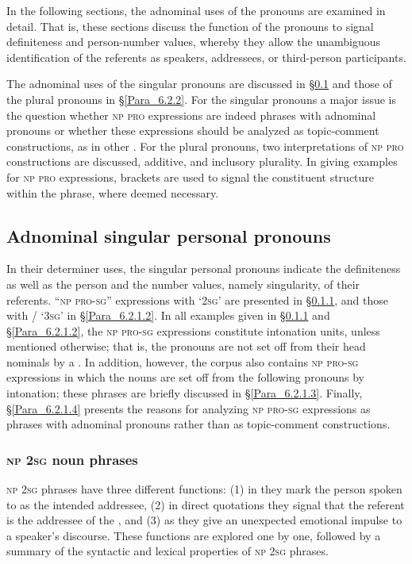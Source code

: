 In the following sections, the adnominal uses of the pronouns are examined in detail. That is, these sections discuss the function of the pronouns to signal definiteness and person-number values, whereby they allow the unambiguous identification of the referents as speakers, addressees, or third-person participants.



The adnominal uses of the singular pronouns are discussed in §\ref{Para_6.2.1} and those of the plural pronouns in §\ref{Para_6.2.2}. For the singular pronouns a major issue is the question whether \textsc{np} \textsc{pro} expressions are indeed  phrases with adnominal pronouns or whether these expressions should be analyzed as topic-comment constructions, as in other . For the plural pronouns, two interpretations of \textsc{np} \textsc{pro} constructions are discussed, additive, and  inclusory plurality. In giving examples for \textsc{np} \textsc{pro} expressions, brackets are used to signal the constituent structure within the  phrase, where deemed necessary.


\subsection{Adnominal singular personal pronouns}
\label{Para_6.2.1}
In their determiner uses, the singular personal pronouns indicate the definiteness as well as the person and the number values, namely singularity, of their referents. ``\textsc{np} \textsc{pro-sg}'' expressions with  ‘\textsc{2sg}’ are presented in §\ref{Para_6.2.1.1}, and those with / ‘\textsc{3sg}’ in §\ref{Para_6.2.1.2}. In all examples given in §\ref{Para_6.2.1.1} and §\ref{Para_6.2.1.2}, the \textsc{np} \textsc{pro-sg} expressions constitute intonation units, unless mentioned otherwise; that is, the pronouns are not set off from their head nominals by a . In addition, however, the corpus also contains \textsc{np} \textsc{pro-sg} expressions in which the nouns are set off from the following pronouns by intonation; these  phrases are briefly discussed in §\ref{Para_6.2.1.3}. Finally, §\ref{Para_6.2.1.4} presents the reasons for analyzing \textsc{np} \textsc{pro-sg} expressions as  phrases with adnominal pronouns rather than as topic-comment constructions.
\subsubsection[\textsc{np} \textsc{2sg} {noun} phrases]{\textsc{np} \textsc{2sg} {noun} phrases}
\label{Para_6.2.1.1}
\textsc{np} \textsc{2sg}  phrases have three different functions: (1) in  they mark the person spoken to as the intended addressee, (2) in direct quotations they signal that the referent is the addressee of the , and (3) as  they give an unexpected emotional impulse to a speaker’s discourse. These functions are explored one by one, followed by a summary of the syntactic and lexical properties of \textsc{np} \textsc{2sg}  phrases.\\
\setcounter{secnumdepth}{4}

